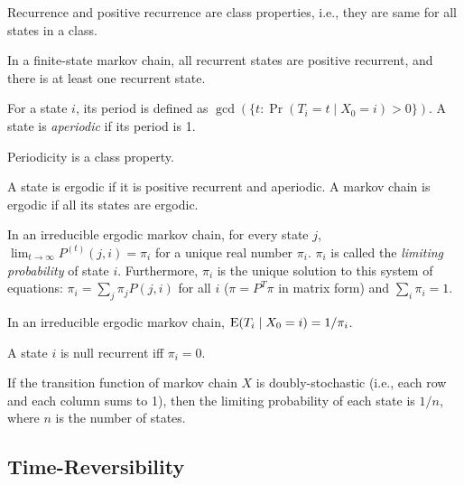 \documentclass[a4paper, 12pt, fleqn]{article}
\begin{document}
\begin{lemma}
Recurrence and positive recurrence are class properties, i.e.,
they are same for all states in a class.
\end{lemma}

\begin{lemma}
In a finite-state markov chain, all recurrent states are positive recurrent,
and there is at least one recurrent state.
\end{lemma}

\begin{definition}[Periodicity]
For a state $i$, its period is defined as $\gcd(\{t: \Pr(T_i=t \mid X_0=i) > 0\})$.
A state is \emph{aperiodic} if its period is 1.
\end{definition}

\begin{lemma}
Periodicity is a class property.
\end{lemma}

\begin{definition}[Ergodicity]
A state is ergodic if it is positive recurrent and aperiodic.
A markov chain is ergodic if all its states are ergodic.
\end{definition}

\begin{lemma}
In an irreducible ergodic markov chain, for every state $j$,
$\lim_{t \to \infty} P^{(t)}(j, i) = \pi_i$ for a unique real number $\pi_i$.
$\pi_i$ is called the \emph{limiting probability} of state $i$.
Furthermore, $\pi_i$ is the unique solution to
this system of equations: $\pi_i = \sum_{j} \pi_j P(j, i)$ for all $i$
($\pi = P^T\pi$ in matrix form) and $\sum_i \pi_i = 1$.
\end{lemma}

\begin{lemma}
In an irreducible ergodic markov chain, $\operatorname*{E}(T_i \mid X_0=i) = 1/\pi_i$.
\end{lemma}
\begin{corollary}
A state $i$ is null recurrent iff $\pi_i = 0$.
\end{corollary}

\begin{theorem}
If the transition function of markov chain $X$ is doubly-stochastic
(i.e., each row and each column sums to 1), then the limiting probability
of each state is $1/n$, where $n$ is the number of states.
\end{theorem}

\subsection{Time-Reversibility}
\end{document}
